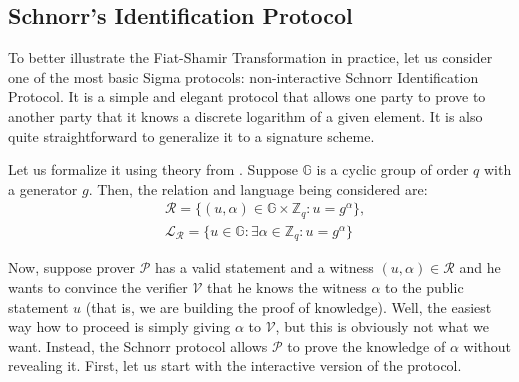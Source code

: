 \documentclass[../lecture-notes.tex]{subfiles}
\begin{document}
\subsection{Schnorr's Identification Protocol}

To better illustrate the Fiat-Shamir Transformation in practice, let us consider one of the most basic Sigma protocols: non-interactive Schnorr Identification Protocol. It is a simple and elegant protocol that allows one party to prove to another party that it knows a discrete logarithm of a given element. It is also quite straightforward to generalize it to a signature scheme.

Let us formalize it using theory from . Suppose $\mathbb{G}$ is a cyclic group of order $q$ with a generator $g$. Then, the relation and language being considered are:
\begin{equation*}
    \begin{aligned}
        &\mathcal{R} = \{(u, \alpha) \in \mathbb{G} \times \mathbb{Z}_q: u = g^{\alpha}\}, \\
        &\mathcal{L}_{\mathcal{R}} = \{u \in \mathbb{G}: \exists \alpha \in \mathbb{Z}_q: u = g^{\alpha}\}        
    \end{aligned}
\end{equation*}

\vspace{-1mm}

Now, suppose prover $\mathcal{P}$ has a valid statement and a witness $(u,\alpha) \in \mathcal{R}$ and he wants to convince the verifier $\mathcal{V}$ that he knows the witness $\alpha$ to the public statement $u$ (that is, we are building the proof of knowledge). Well, the easiest way how to proceed is simply giving $\alpha$ to $\mathcal{V}$, but this is obviously not what we want. Instead, the Schnorr protocol allows $\mathcal{P}$ to prove the knowledge of $\alpha$ without revealing it. 
First, let us start with the interactive version of the protocol. 

\vspace{-2mm}
\end{document}

